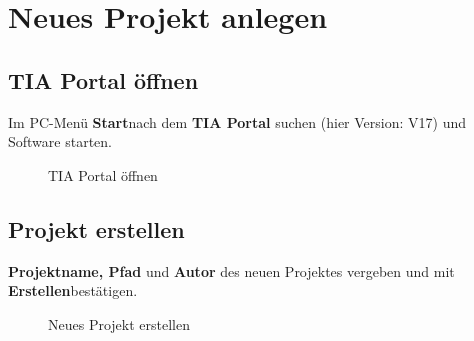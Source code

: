\section{Neues Projekt anlegen} \label{sec: Neues_Projekt_anlegen}

\subsection{TIA Portal öffnen}
Im PC-Menü \glqq\textbf{Start}\grqq\:nach dem \textbf{TIA Portal} suchen (hier Version: V17) und Software starten.
\begin{figure}[H]
   \centering
   \caption[TIA Portal öffnen]{TIA Portal öffnen}
   \label{fig:Bild2.1}
\end{figure}

\subsection{Projekt erstellen}
\textbf{Projektname, Pfad} und \textbf{Autor} des neuen Projektes vergeben und mit \glqq\textbf{Erstellen}\grqq\:bestätigen.
\begin{figure}[H]
   \centering
   \caption[Neues Projekt erstellen]{Neues Projekt erstellen}
   \label{fig:Bild2.2}
\end{figure}

\clearpage

